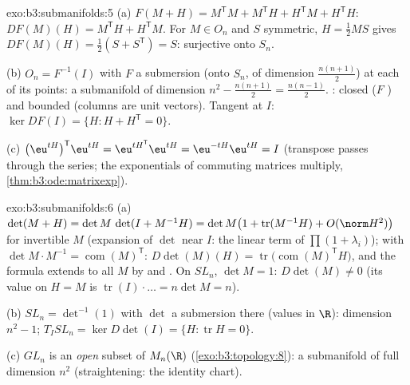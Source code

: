 \begin{solution}{exo:b3:submanifolds:5}
(a) $F(M + H) = M^{\mathsf T}M + M^{\mathsf T}H + H^{\mathsf
T}M + H^{\mathsf T}H$: $DF(M)(H) = M^{\mathsf T}H +
H^{\mathsf T}M$. For $M \in O_n$ and $S$ symmetric, $H =
\frac12MS$ gives $DF(M)(H) = \frac12(S + S^{\mathsf T}) = S$:
surjective onto $S_n$.

(b) $O_n = F^{-1}(I)$ with $F$ a submersion (onto $S_n$, of
dimension $\frac{n(n+1)}2$) at each of its points:
a submanifold of dimension $n^2 - \frac{n(n+1)}2 =
\frac{n(n-1)}2$. : closed ($F$ ) and bounded
(columns are unit vectors). Tangent at $I$: $\ker DF(I) =
\{H : H + H^{\mathsf T} = 0\}$.

(c) $\bigl(\eu^{tH}\bigr)^{\mathsf T}\eu^{tH} =
\eu^{tH^{\mathsf T}}\eu^{tH} = \eu^{-tH}\eu^{tH} = I$
(transpose passes through the series; the exponentials of
commuting matrices multiply,
\cref{thm:b3:ode:matrixexp}).
\end{solution}

\begin{solution}{exo:b3:submanifolds:6}
(a) $\det(M + H) = \det M\,\det(I + M^{-1}H) = \det M\bigl(1
+ \operatorname{tr}(M^{-1}H) + O(\norm H^2)\bigr)$ for
invertible $M$ (expansion of $\det$ near $I$: the linear term
of $\prod(1 + \lambda_i)$); with $\det M\cdot M^{-1} =
\operatorname{com}(M)^{\mathsf T}$:
$D\det(M)(H) = \operatorname{tr}\bigl(\operatorname{com}
(M)^{\mathsf T}H\bigr)$, and the formula extends to all $M$
by  and . On $SL_n$, $\det M = 1$:
$D\det(M) \ne 0$ (its value on $H = M$ is
$\operatorname{tr}(I)\cdot\dots = n\det M = n$).

(b) $SL_n = \det^{-1}(1)$ with $\det$ a submersion there
(values in $\R$): dimension $n^2 - 1$; $T_ISL_n = \ker
D\det(I) = \{H : \operatorname{tr}H = 0\}$.

(c) $GL_n$ is an \emph{open} subset of $M_n(\R)$
(\cref{exo:b3:topology:8}): a submanifold of full dimension
$n^2$ (straightening: the identity chart).
\end{solution}

